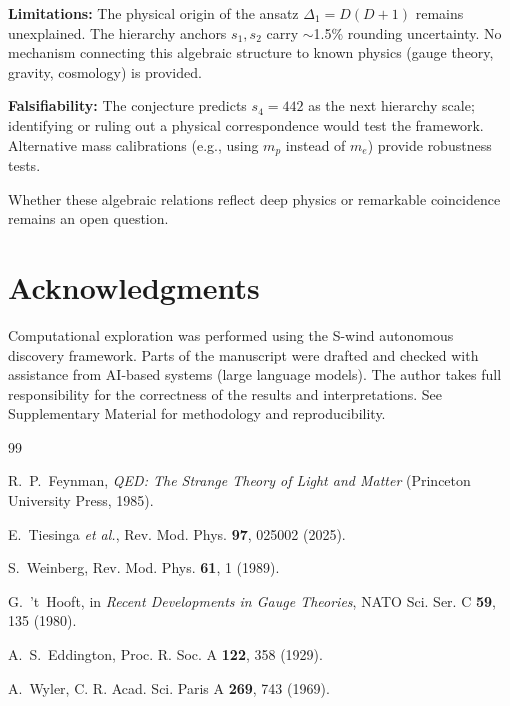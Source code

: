 \documentclass[11pt,a4paper]{article}
\begin{document}
\textbf{Limitations:} The physical origin of the ansatz $\Delta_1 = D(D+1)$ 
remains unexplained. The hierarchy anchors $s_1, s_2$ carry $\sim$1.5\% 
rounding uncertainty. No mechanism connecting this algebraic structure 
to known physics (gauge theory, gravity, cosmology) is provided.

\textbf{Falsifiability:} The conjecture predicts $s_4 = 442$ as the next 
hierarchy scale; identifying or ruling out a physical correspondence would 
test the framework. Alternative mass calibrations (e.g., using $m_p$ instead 
of $m_e$) provide robustness tests.

Whether these algebraic relations reflect deep physics or remarkable 
coincidence remains an open question.

\section*{Acknowledgments}
Computational exploration was performed using the S-wind autonomous discovery 
framework. Parts of the manuscript were drafted and checked with assistance 
from AI-based systems (large language models). The author takes full 
responsibility for the correctness of the results and interpretations.
See Supplementary Material for methodology and reproducibility.

\begin{thebibliography}{99}

R.~P.~Feynman, \emph{QED: The Strange Theory of Light and Matter} 
(Princeton University Press, 1985).

E.~Tiesinga \emph{et al.}, Rev. Mod. Phys. \textbf{97}, 025002 (2025).

S.~Weinberg, Rev. Mod. Phys. \textbf{61}, 1 (1989).

G.~'t~Hooft, in \emph{Recent Developments in Gauge Theories}, 
NATO Sci. Ser. C \textbf{59}, 135 (1980).

A.~S.~Eddington, Proc. R. Soc. A \textbf{122}, 358 (1929).

A.~Wyler, C. R. Acad. Sci. Paris A \textbf{269}, 743 (1969).

\end{thebibliography}
\end{document}
